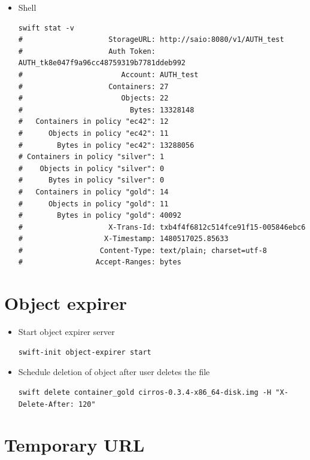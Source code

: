 \documentclass{article}
\begin{document}
\begin{itemize}
\begin{itemize}
\item Shell
\begin{verbatim}
swift stat -v
#                    StorageURL: http://saio:8080/v1/AUTH_test
#                    Auth Token: AUTH_tk8e047f9a96cc48759319b7781ddeb992
#                       Account: AUTH_test
#                    Containers: 27
#                       Objects: 22
#                         Bytes: 13328148
#   Containers in policy "ec42": 12
#      Objects in policy "ec42": 11
#        Bytes in policy "ec42": 13288056
# Containers in policy "silver": 1
#    Objects in policy "silver": 0
#      Bytes in policy "silver": 0
#   Containers in policy "gold": 14
#      Objects in policy "gold": 11
#        Bytes in policy "gold": 40092
#                    X-Trans-Id: txb4f4f6812c514fce91f15-005846ebc6
#                   X-Timestamp: 1480517025.85633
#                  Content-Type: text/plain; charset=utf-8
#                 Accept-Ranges: bytes
\end{verbatim}
\end{itemize}
\end{itemize}

\section{Object expirer}
\label{sec:orgcfcf6a2}

\begin{itemize}
\item Start object expirer server

\begin{verbatim}
swift-init object-expirer start
\end{verbatim}

\item Schedule deletion of object after user deletes the file

\begin{verbatim}
swift delete container_gold cirros-0.3.4-x86_64-disk.img -H "X-Delete-After: 120"
\end{verbatim}
\end{itemize}

\section{Temporary URL}
\label{sec:org83159b8}
\end{document}
